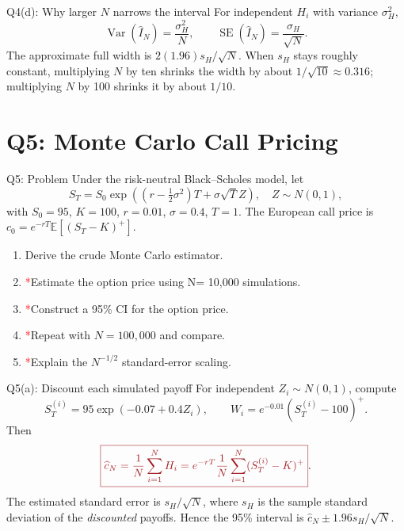 \documentclass{beamer}
\newcommand{\keybox}[1]{\textcolor{lecturekey}{\boxed{#1}}}
\newcommand{\E}{\mathbb E}
\newcommand{\Var}{\operatorname{Var}}
\newcommand{\SE}{\operatorname{SE}}
\newcommand{\redstar}{\textcolor{red}{*}}
\begin{document}
\begin{frame}{Q4(d): Why larger $N$ narrows the interval}
\small
For independent $H_i$ with variance $\sigma_H^2$,
\[
\Var(\widehat I_N)=\frac{\sigma_H^2}{N},\qquad
\SE(\widehat I_N)=\frac{\sigma_H}{\sqrt N}.
\]
The approximate full width is $2(1.96)s_H/\sqrt N$.
When $s_H$ stays roughly constant, multiplying $N$ by ten shrinks the
width by about $1/\sqrt{10}\approx0.316$; multiplying $N$ by 100
shrinks it by about $1/10$.
\end{frame}

\section[Q5]{Q5: Monte Carlo Call Pricing}

\begin{frame}{Q5: Problem}
\small
Under the risk-neutral Black--Scholes model, let
\[
S_T=S_0\exp\!\left((r-\tfrac12\sigma^2)T+\sigma\sqrt T Z\right),
\quad Z\sim N(0,1),
\]
with $S_0=95$, $K=100$, $r=0.01$, $\sigma=0.4$, $T=1$.
The European call price is $c_0=e^{-rT}\E[(S_T-K)^+]$.
\begin{enumerate}
\item[(a)] Derive the crude Monte Carlo estimator.
\item[(b)] \redstar Estimate the option price using N= 10,000 simulations.
\item[(c)] \redstar Construct a 95\% CI for the option price.
\item[(d)] \redstar Repeat with $N=100{,}000$ and compare.
\item[(e)] \redstar Explain the $N^{-1/2}$ standard-error scaling.
\end{enumerate}
\end{frame}

\begin{frame}{Q5(a): Discount each simulated payoff}
\small
For independent $Z_i\sim N(0,1)$, compute
\[
S_T^{(i)}=95\exp(-0.07+0.4Z_i),\qquad
W_i=e^{-0.01}(S_T^{(i)}-100)^+.
\]
Then
\[
\keybox{\widehat c_N=\frac1N\sum_{i=1}^N H_i
=e^{-rT}\frac1N\sum_{i=1}^N(S_T^{(i)}-K)^+}.
\]
The estimated standard error is $s_H/\sqrt N$, where $s_H$ is the sample
standard deviation of the \emph{discounted} payoffs. Hence the 95\%
interval is $\widehat c_N\pm1.96s_H/\sqrt N$.
\end{frame}
\end{document}
